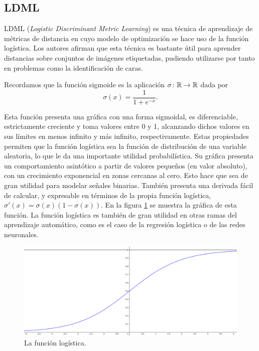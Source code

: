 \documentclass{book}
\begin{document}




\subsection{LDML}

LDML (\emph{Logistic Discriminant Metric Learning}) \cite{ldml} es una técnica de aprendizaje de métricas de distancia en cuyo modelo de optimización se hace uso de la función logística. Los autores afirman que esta técnica es bastante útil para aprender distancias sobre conjuntos de imágenes etiquetadas, pudiendo utilizarse por tanto en problemas como la identificación de caras.

Recordamos que la función sigmoide es la aplicación $\sigma\colon \mathbb{R} \to \mathbb{R}$ dada por
\[ \sigma(x) = \frac{1}{1+e^{-x}}. \]

Esta función presenta una gráfica con una forma sigmoidal, es diferenciable, estrictamente creciente y toma valores entre 0 y 1, alcanzando dichos valores en sus límites en menos infinito y más infinito, respectivamente. Estas propiedades permiten que la función logística sea la función de distribución de una variable aleatoria, lo que le da una importante utilidad probabilística. Su gráfica presenta  un comportamiento asintótico a partir de valores pequeños (en valor absoluto), con un crecimiento exponencial en zonas cercanas al cero. Esto hace que sea de gran utilidad para modelar señales binarias. También presenta una derivada fácil de calcular, y expresable en términos de la propia función logística, $\sigma'(x) = \sigma(x)(1-\sigma(x))$. En la figura \ref{fig:funcion_logistica} se muestra la gráfica de esta función. La función logística es también de gran utilidad en otras ramas del aprendizaje automático, como es el caso de la regresión logística o de las redes neuronales.

\begin{figure}[h]
	\centering
	\includegraphics[width=1.0\textwidth]{images/logistica.png}
	\caption{La función logística.} \label{fig:funcion_logistica}
\end{figure}
\end{document}
